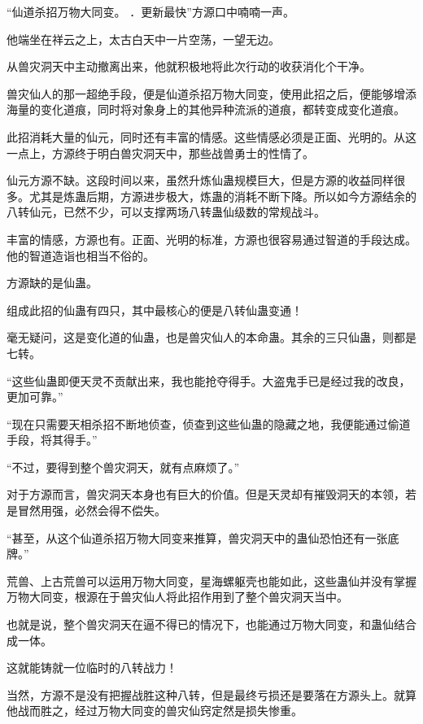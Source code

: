 
\begin{this_body}



“仙道杀招万物大同变。 ．更新最快”方源口中喃喃一声。

他端坐在祥云之上，太古白天中一片空荡，一望无边。

从兽灾洞天中主动撤离出来，他就积极地将此次行动的收获消化个干净。

兽灾仙人的那一超绝手段，便是仙道杀招万物大同变，使用此招之后，便能够增添海量的变化道痕，同时将对象身上的其他异种流派的道痕，都转变成变化道痕。

此招消耗大量的仙元，同时还有丰富的情感。这些情感必须是正面、光明的。从这一点上，方源终于明白兽灾洞天中，那些战兽勇士的性情了。

仙元方源不缺。这段时间以来，虽然升炼仙蛊规模巨大，但是方源的收益同样很多。尤其是炼蛊后期，方源进步极大，炼蛊的消耗不断下降。所以如今方源结余的八转仙元，已然不少，可以支撑两场八转蛊仙级数的常规战斗。

丰富的情感，方源也有。正面、光明的标准，方源也很容易通过智道的手段达成。他的智道造诣也相当不俗的。

方源缺的是仙蛊。

组成此招的仙蛊有四只，其中最核心的便是八转仙蛊变通！

毫无疑问，这是变化道的仙蛊，也是兽灾仙人的本命蛊。其余的三只仙蛊，则都是七转。

“这些仙蛊即便天灵不贡献出来，我也能抢夺得手。大盗鬼手已是经过我的改良，更加可靠。”

“现在只需要天相杀招不断地侦查，侦查到这些仙蛊的隐藏之地，我便能通过偷道手段，将其得手。”

“不过，要得到整个兽灾洞天，就有点麻烦了。”

对于方源而言，兽灾洞天本身也有巨大的价值。但是天灵却有摧毁洞天的本领，若是冒然用强，必然会得不偿失。

“甚至，从这个仙道杀招万物大同变来推算，兽灾洞天中的蛊仙恐怕还有一张底牌。”

荒兽、上古荒兽可以运用万物大同变，星海螺躯壳也能如此，这些蛊仙并没有掌握万物大同变，根源在于兽灾仙人将此招作用到了整个兽灾洞天当中。

也就是说，整个兽灾洞天在逼不得已的情况下，也能通过万物大同变，和蛊仙结合成一体。

这就能铸就一位临时的八转战力！

当然，方源不是没有把握战胜这种八转，但是最终亏损还是要落在方源头上。就算他战而胜之，经过万物大同变的兽灾仙窍定然是损失惨重。


\end{this_body}

